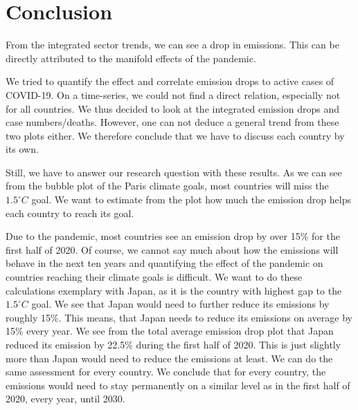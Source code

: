 \section{Conclusion}

From the integrated sector trends, we can see a drop in \co emissions. This can be directly attributed to the manifold effects of the pandemic. 

We tried to quantify the effect and correlate emission drops to active cases of COVID-19. On a time-series, we could not find a direct relation, especially not for all countries. We thus decided to look at the integrated emission drops and case numbers/deaths. However, one can not deduce a general trend from these two plots either. We therefore conclude that we have to discuss each country by its own.

Still, we have to answer our research question with these results. As we can see from the bubble plot of the Paris climate goals, most countries will miss the \(1.5^\circ C\) goal. We want to estimate from the plot how much the emission drop helps each country to reach its goal.

Due to the pandemic, most countries see an emission drop by over 15\% for the first half of 2020. Of course, we cannot say much about how the \co emissions will behave in the next ten years and quantifying the effect of the pandemic on countries reaching their climate goals is difficult. We want to do these calculations exemplary with Japan, as it is the country with highest gap to the \(1.5^\circ C\) goal. We see that Japan would need to further reduce its emissions by roughly 15\%. This means, that Japan needs to reduce its emissions on average by 15\% every year. We see from the total average emission drop plot that Japan reduced its emission by 22.5\% during the first half of 2020. This is just slightly more than Japan would need to reduce the emissions at least. We can do the same assessment for every country. We conclude that for every country, the emissions would need to stay permanently on a similar level as in the first half of 2020, every year, until 2030.




